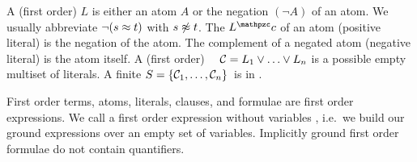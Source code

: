 
\begin{definition}\label{def:literals}\label{def:syntax:CNF}
A (first order)  $L$ is either an atom $A$ or the negation
$(\lnot A)$ of an atom. We usually abbreviate $\lnot(s\approx t)$ with $s\not\approx t$.
%
The  $L^\mcc$ of an atom (positive literal) is the negation of the atom.
The complement of a negated atom (negative literal) is the atom itself.
A (first order) \ \ $\mathcal{C} = L_1\lor\ldots\lor L_n$  is a possible empty multiset of literals.
A finite  $S=\{ \mathcal{C}_1,\ldots,\mathcal{C}_n \}$ is in .
\end{definition}

\begin{remark}
	First order terms, atoms, literals, clauses, and formulae are first order expressions.
	We call a first order expression without variables ,
	i.e.~we build our ground expressions over an empty set of variables.
	Implicitly ground first order formulae do not contain quantifiers.
\end{remark}



